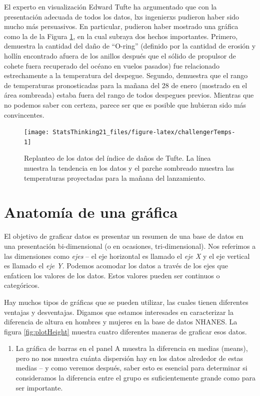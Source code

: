 \documentclass[
  12pt,
]{book}
\providecommand{\tightlist}{%
  \setlength{\itemsep}{0pt}\setlength{\parskip}{0pt}}
\theoremstyle{definition}
\theoremstyle{definition}
\theoremstyle{definition}
\theoremstyle{remark}
\begin{document}
El experto en visualización Edward Tufte ha argumentado que con la presentación adecuada de todos los datos, lxs ingenierxs pudieron haber sido mucho más persuasivos. En particular, pudieron haber mostrado una gráfica como la de la Figura \ref{fig:challengerTemps}, en la cual subraya dos hechos importantes. Primero, demuestra la cantidad del daño de ``O-ring'' (definido por la cantidad de erosión y hollín encontrado afuera de los anillos después que el sólido de propulsor de cohete fuera recuperado del océano en vuelos pasados) fue relacionado estrechamente a la temperatura del despegue. Segundo, demuestra que el rango de temperaturas pronosticadas para la mañana del 28 de enero (mostrado en el área sombreada) estaba fuera del rango de todos despegues previos. Mientras que no podemos saber con certeza, parece ser que es posible que hubieran sido más convincentes.

\begin{figure}
\texttt{[image: StatsThinking21\_files/figure-latex/challengerTemps-1]} \caption{Replanteo de los datos del índice de daños de Tufte. La línea muestra la tendencia en los datos y el parche sombreado muestra las temperaturas proyectadas para la mañana del lanzamiento.}\label{fig:challengerTemps}
\end{figure}

\hypertarget{anatomuxeda-de-una-gruxe1fica}{%
\section{Anatomía de una gráfica}\label{anatomuxeda-de-una-gruxe1fica}}

El objetivo de graficar datos es presentar un resumen de una base de datos en una presentación bi-dimensional (o en ocasiones, tri-dimensional). Nos referimos a las dimensiones como \emph{ejes} -- el eje horizontal es llamado el \emph{eje X} y el eje vertical es llamado el \emph{eje Y}. Podemos acomodar los datos a través de los ejes que enfaticen los valores de los datos. Estos valores pueden ser continuos o categóricos.

Hay muchos tipos de gráficas que se pueden utilizar, las cuales tienen diferentes ventajas y desventajas. Digamos que estamos interesades en caracterizar la diferencia de altura en hombres y mujeres en la base de datos NHANES. La figura \ref{fig:plotHeight} muestra cuatro diferentes maneras de graficar esos datos.

\begin{enumerate}
\def\labelenumi{\arabic{enumi}.}
\tightlist
\item
  La gráfica de barras en el panel A muestra la diferencia en medias (means), pero no nos muestra cuánta dispersión hay en los datos alrededor de estas medias -- y como veremos después, saber esto es esencial para determinar si consideramos la diferencia entre el grupo es suficientemente grande como para ser importante.
\end{enumerate}
\end{document}

